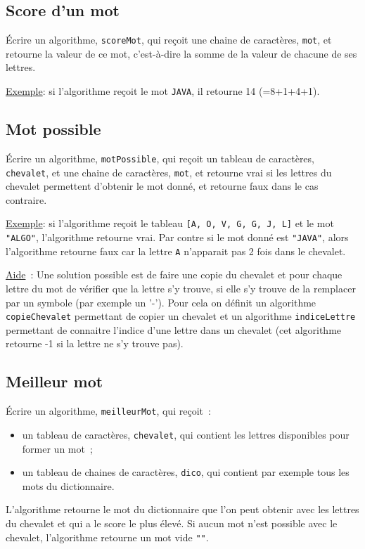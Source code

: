 		\subsection*{Score d’un mot}
			
			\'Ecrire un algorithme, \texttt{scoreMot}, 
			qui reçoit une chaine de caractères, 
			\texttt{mot}, et retourne la valeur de ce mot, c’est-à-dire la somme de la valeur de chacune de ses lettres.
	
			\underline{Exemple}: si l’algorithme reçoit le mot \texttt{JAVA}, il retourne 14 (=8+1+4+1).
	
		\subsection*{Mot possible}
	
			\'Ecrire un algorithme, \texttt{motPossible}, qui reçoit un tableau de caractères, 
			\texttt{chevalet}, et une chaine de caractères, 
			\texttt{mot}, et retourne vrai si les lettres du chevalet permettent d’obtenir le mot donné, et retourne faux dans le cas contraire. 
	
	
			\underline{Exemple}: si l’algorithme reçoit le tableau \texttt{[A, O, V, G, G, J, L]} 
			et le mot \texttt{"ALGO"}, l’algorithme retourne vrai. 
			Par contre si le mot donné est \texttt{"JAVA"}, 
			alors l’algorithme retourne faux car la lettre \texttt{A} n’apparait pas 2 fois dans le chevalet.
	
	
			\underline{Aide}~: Une solution possible est de faire une copie du chevalet 
			et pour chaque lettre du mot de vérifier que la lettre s’y trouve, 
			si elle s’y trouve de la remplacer par un symbole (par exemple un '-').
			Pour cela on définit un algorithme \texttt{copieChevalet} 
			permettant de copier un chevalet et un algorithme \texttt{indiceLettre} 
			permettant de connaitre l’indice d’une lettre dans un chevalet 
			(cet algorithme retourne -1 si la lettre ne s’y trouve pas). 
	
		\subsection*{Meilleur mot}
	
			\'Ecrire un algorithme, \texttt{meilleurMot}, qui reçoit~:
			\begin{itemize}
			\item un tableau de caractères, \texttt{chevalet}, qui contient les lettres disponibles pour former un mot~;
			\item un tableau de chaines de caractères, \texttt{dico}, qui contient par exemple tous les mots du dictionnaire.
			\end{itemize}
			L’algorithme retourne le mot du dictionnaire que l’on peut obtenir avec les lettres du chevalet 
			et qui a le score le plus élevé. 
			Si aucun mot n’est possible avec le chevalet, l’algorithme retourne un mot vide \texttt{""}.
	
